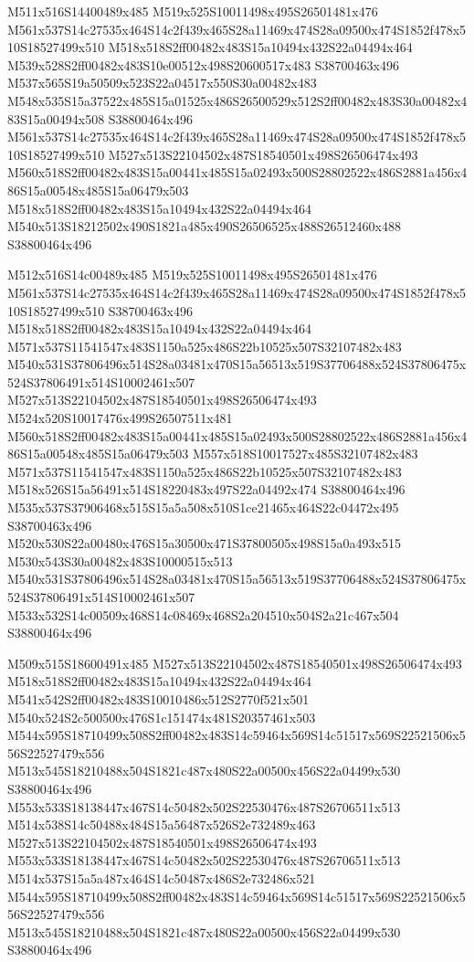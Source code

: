 \documentclass{article}
\begin{document}
\begin{multicols}{2}
M511x516S14400489x485 M519x525S10011498x495S26501481x476 M561x537S14c27535x464S14c2f439x465S28a11469x474S28a09500x474S1852f478x510S18527499x510 M518x518S2ff00482x483S15a10494x432S22a04494x464 M539x528S2ff00482x483S10e00512x498S20600517x483 S38700463x496 M537x565S19a50509x523S22a04517x550S30a00482x483 M548x535S15a37522x485S15a01525x486S26500529x512S2ff00482x483S30a00482x483S15a00494x508 S38800464x496 M561x537S14c27535x464S14c2f439x465S28a11469x474S28a09500x474S1852f478x510S18527499x510 M527x513S22104502x487S18540501x498S26506474x493 M560x518S2ff00482x483S15a00441x485S15a02493x500S28802522x486S2881a456x486S15a00548x485S15a06479x503 M518x518S2ff00482x483S15a10494x432S22a04494x464 M540x513S18212502x490S1821a485x490S26506525x488S26512460x488 S38800464x496

M512x516S14c00489x485 M519x525S10011498x495S26501481x476 M561x537S14c27535x464S14c2f439x465S28a11469x474S28a09500x474S1852f478x510S18527499x510 S38700463x496 M518x518S2ff00482x483S15a10494x432S22a04494x464 M571x537S11541547x483S1150a525x486S22b10525x507S32107482x483 M540x531S37806496x514S28a03481x470S15a56513x519S37706488x524S37806475x524S37806491x514S10002461x507 M527x513S22104502x487S18540501x498S26506474x493 M524x520S10017476x499S26507511x481 M560x518S2ff00482x483S15a00441x485S15a02493x500S28802522x486S2881a456x486S15a00548x485S15a06479x503 M557x518S10017527x485S32107482x483 M571x537S11541547x483S1150a525x486S22b10525x507S32107482x483 M518x526S15a56491x514S18220483x497S22a04492x474 S38800464x496 M535x537S37906468x515S15a5a508x510S1ce21465x464S22c04472x495 S38700463x496 M520x530S22a00480x476S15a30500x471S37800505x498S15a0a493x515 M530x543S30a00482x483S10000515x513 M540x531S37806496x514S28a03481x470S15a56513x519S37706488x524S37806475x524S37806491x514S10002461x507 M533x532S14c00509x468S14c08469x468S2a204510x504S2a21c467x504 S38800464x496

M509x515S18600491x485 M527x513S22104502x487S18540501x498S26506474x493 M518x518S2ff00482x483S15a10494x432S22a04494x464 M541x542S2ff00482x483S10010486x512S2770f521x501 M540x524S2c500500x476S1c151474x481S20357461x503 M544x595S18710499x508S2ff00482x483S14c59464x569S14c51517x569S22521506x556S22527479x556 M513x545S18210488x504S1821c487x480S22a00500x456S22a04499x530 S38800464x496 M553x533S18138447x467S14c50482x502S22530476x487S26706511x513 M514x538S14c50488x484S15a56487x526S2e732489x463 M527x513S22104502x487S18540501x498S26506474x493 M553x533S18138447x467S14c50482x502S22530476x487S26706511x513 M514x537S15a5a487x464S14c50487x486S2e732486x521 M544x595S18710499x508S2ff00482x483S14c59464x569S14c51517x569S22521506x556S22527479x556 M513x545S18210488x504S1821c487x480S22a00500x456S22a04499x530 S38800464x496


\end{multicols}
\end{document}
